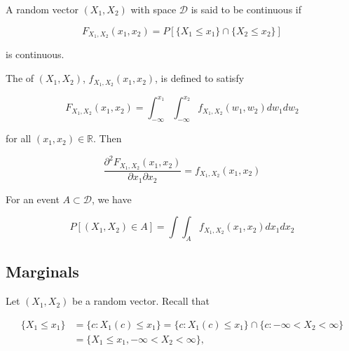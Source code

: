 \documentclass{article}
\begin{document}
            A random vector $ (X_{1}, X_{2}) $ with space $ \mathcal{D} $ is
            said to be continuous if

            \begin{equation*}
                F_{X_{1}, X_{2}}(x_{1}, x_{2}) = P [  \{ X_{1} \leq x_{1} \}
                  \cap  \{ X_{2} \leq x_{2} \} ]
            \end{equation*}

            is continuous.

            The  of $ (X_{1}, X_{2})
            $, $ f_{X_{1}, X_{2}}(x_{1}, x_{2}) $, is defined to satisfy

            \begin{equation*}
                 F_{X_{1}, X_{2}} (x_{1}, x_{2}) = \int_{-\infty}^{x_{1}}
                     \int_{-\infty}^{x_{2}} f_{X_{1}, X_{2}} (w_{1}, w_{2}) d w_{1} d w_{2}
            \end{equation*}

            for all $ (x_{1}, x_{2}) \in \mathbb{R} $. Then

            \begin{equation*}
                 \frac{\partial^{2} F_{X_{1}, X_{2}} (x_{1}, x_{2})}{\partial
                     x_{1} \partial x_{2}} = f_{X_{1}, X_{2}} (x_{1}, x_{2})
            \end{equation*}

            For an event $ A \subset \mathcal{D} $, we have

            \begin{equation*}
                 P [ (X_{1}, X_{2}) \in A ] = \int \int_{A} f_{X_{1}, X_{2}}
                     (x_{1}, x_{2}) d x_{1} d x_{2}
            \end{equation*}

        \subsection{Marginals}

            Let $ (X_{1}, X_{2}) $ be a random vector. Recall that

            \begin{align*}
                \{ X_{1} \leq x_{1} \} &= \{ c : X_{1}(c) \leq x_{1} \}
                    = \{ c: X_{1}(c) \leq x_{1} \} \cap \{ c: -\infty < X_{2} < \infty \} \\
                                       &= \{ X_{1} \leq x_{1}, -\infty < X_{2} < \infty \},
            \end{align*}
\end{document}
